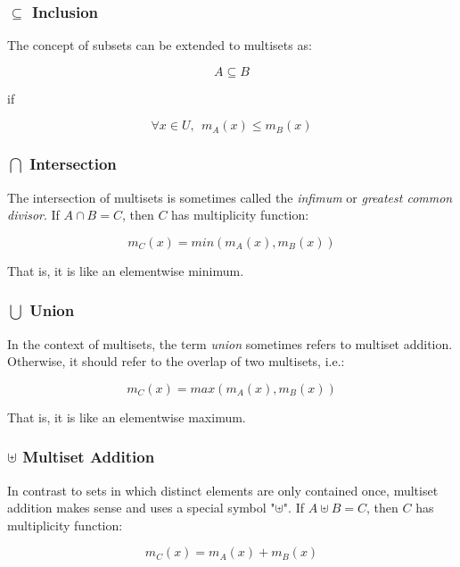 \subsubsection{$\subseteq$ Inclusion}
The concept of subsets can be extended to multisets as:

\begin{equation}
A \subseteq B
\end{equation}

if 

\begin{equation}
\forall x\in U, \ \ m_A(x) \leq m_B(x)
\end{equation}


\subsubsection{$\bigcap$ Intersection}
The intersection of multisets is sometimes called the \textit{infimum} or \textit{greatest common divisor}. If $A\cap B = C$, then $C$ has multiplicity function:

\begin{equation}
m_C(x) = min\left(m_A(x),m_B(x)\right)
\end{equation}

That is, it is like an elementwise minimum.

\subsubsection{$\bigcup$ Union}
In the context of multisets, the term \textit{union} sometimes refers to multiset addition. Otherwise, it should refer to the overlap of two multisets, i.e.:
 
\begin{equation}
m_C(x) = max\left(m_A(x),m_B(x)\right)
\end{equation}

That is, it is like an elementwise maximum.

\subsubsection{$\uplus$ Multiset Addition} 
In contrast to sets in which distinct elements are only contained once, multiset addition makes sense and uses a special symbol "$\uplus$". If $A\uplus B = C$, then $C$ has multiplicity function:

\begin{equation}
m_C(x) = m_A(x) + m_B(x)
\end{equation} 

